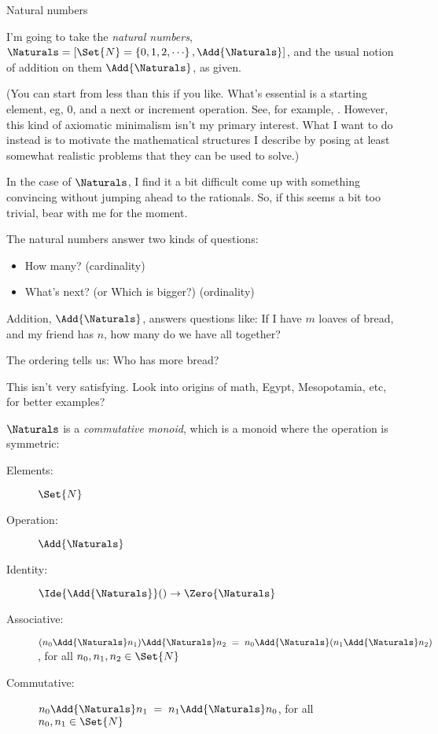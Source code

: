 \documentclass[12pt]{PalisadesLakesBook}
\begin{document}
\begin{plSection}{Natural numbers}

I'm going to take the \emph{natural numbers},
$\Naturals =
 [ \Set{N}=\left\{ 0, 1, 2, {\cdots}\right\}, \Add{\Naturals}]$,
and the usual notion of addition on them $\Add{\Naturals}$,
as given.

(You can start from less than this if you like.
What's essential is a starting element, eg, $0$,
and a {\pseudocodeFont next}
or {\pseudocodeFont increment} operation. 
See, for example, 
.
However, this kind of axiomatic minimalism 
isn't my primary interest.
What I want to do instead is to motivate the mathematical
structures I describe by posing at least somewhat realistic
problems that they can be used to solve.)

In the case of $\Naturals$, I find it a bit difficult 
come up with something convincing without
jumping ahead to the rationals.
So, if this seems a bit too trivial,
 bear with me for the moment.

The natural numbers answer two kinds of questions:
\begin{itemize}
\item How many?
(cardinality)
\item What's next?
(or Which is bigger?)
(ordinality)
\end{itemize}

Addition, $\Add{\Naturals}$, answers questions like:
If I have $m$ loaves of bread,
and my friend has $n$, how many do we have all together?

The ordering tells us: Who has more bread?

\TODO This isn't very satisfying.
Look into origins of math, Egypt, Mesopotamia, etc, for better
examples?

$\Naturals$ is a \emph{commutative monoid},
which is a monoid where the operation is symmetric:
\begin{description}
\item[Elements:] $\Set{N}$
\item[Operation:] $\Add{\Naturals}$
\item[Identity:] $\Ide{\Add{\Naturals}}() \rightarrow \Zero{\Naturals}$
\item[Associative:] 
$(n_0 \Add{\Naturals} n_1) \Add{\Naturals} n_2 \;=\;
n_0 \Add{\Naturals} (n_1 \Add{\Naturals} n_2)$, 
for all $n_0, n_1, n_2 \in \Set{N}$
\item[Commutative:] $n_0 \Add{\Naturals} n_1 \;=\;
n_1 \Add{\Naturals} n_0$,
for all $n_0, n_1 \in \Set{N}$
\end{description}


\end{plSection}
\end{document}
